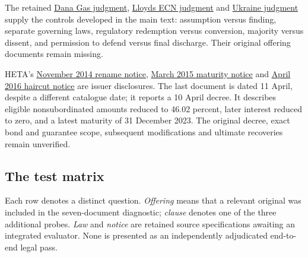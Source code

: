 The retained \href{../prospectus/corner-cases-2026-10-04/sources/jur-more-dana-judgment/source.pdf}
{Dana Gas judgment}, \href{../prospectus/corner-cases-2026-10-04/sources/jur-more-lloyds-generated/source.pdf}
{Lloyds ECN judgment} and
\href{../prospectus/corner-cases-2026-10-04/sources/jur-more-ukraine-judgment/source.pdf}
{Ukraine judgment} supply the controls developed in the main text:
assumption versus finding, separate governing laws, regulatory redemption
versus conversion, majority versus dissent, and permission to defend versus
final discharge. Their original offering documents remain missing.

HETA's \href{../prospectus/corner-cases-2026-10-04/sources/jur-more-heta-2232299/source.pdf}
{November 2014 rename notice}, \href{../prospectus/corner-cases-2026-10-04/sources/jur-more-heta-2356087/source.pdf}
{March 2015 maturity notice} and
\href{../prospectus/corner-cases-2026-10-04/sources/jur-more-heta-2789331/source.pdf}
{April 2016 haircut notice} are issuer disclosures.
The last document is dated 11 April, despite a different catalogue date;
it reports a 10 April decree. It describes eligible nonsubordinated amounts
reduced to 46.02 percent, later interest reduced to zero, and a latest
maturity of 31 December 2023. The original decree, exact bond and guarantee
scope, subsequent modifications and ultimate recoveries remain unverified.

\subsection{The test matrix}

Each row denotes a distinct question. \emph{Offering} means that a relevant
original was included in the seven-document diagnostic; \emph{clause} denotes
one of the three additional probes. \emph{Law} and \emph{notice} are retained
source specifications awaiting an integrated evaluator. None is presented
as an independently adjudicated end-to-end legal pass.

